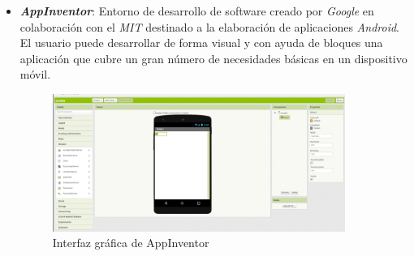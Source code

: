 \begin{itemize}
    \item \textit{\textbf{AppInventor}}\cite{bib:appinventor}: Entorno de desarrollo de software creado por \textit{Google} en colaboración con el \textit{MIT} destinado a la elaboración de aplicaciones \textit{Android}. El usuario puede desarrollar de forma visual y con ayuda de bloques una aplicación que cubre un gran número de necesidades básicas en un dispositivo móvil.
        \begin{figure}[h]
        \centering
        \includegraphics[width=0.9\textwidth]{img/AppInventor.png}
        \caption{Interfaz gráfica de AppInventor} \label{fig:appinventor}
    \end{figure}

\end{itemize}


